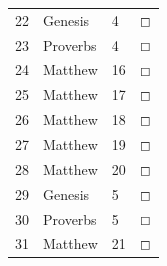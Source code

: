 \documentclass[11pt,landscape,twocolumn,letterpaper]{article}
\begin{document}
\begin{tabular}{p{0.5in}p{1.6in}p{1.3in}p{0.35in}}
  \textcolor[rgb]{0.00,0.00,1.00}{22} & \textcolor[rgb]{0.00,0.00,1.00}{\textcolor[rgb]{0.98,0.00,0.00}{Genesis}} & \textcolor[rgb]{0.98,0.00,0.00}{4} & \textcolor[rgb]{0.00,0.00,1.00}{$\boxempty$}\\

  \textcolor[rgb]{0.00,0.00,1.00}{23} & \textcolor[rgb]{0.00,0.00,1.00}{\textcolor[rgb]{0.98,0.00,0.00}{Proverbs}} & \textcolor[rgb]{0.98,0.00,0.00}{4} & \textcolor[rgb]{0.00,0.00,1.00}{$\boxempty$}\\

  \textcolor[rgb]{0.00,0.00,1.00}{24} & \textcolor[rgb]{0.00,0.00,1.00}{Matthew} & 16 & \textcolor[rgb]{0.00,0.00,1.00}{$\boxempty$}\\

  \textcolor[rgb]{0.00,0.00,1.00}{25} & \textcolor[rgb]{0.00,0.00,1.00}{Matthew} & 17 & \textcolor[rgb]{0.00,0.00,1.00}{$\boxempty$}\\

  \textcolor[rgb]{0.00,0.00,1.00}{26} & \textcolor[rgb]{0.00,0.00,1.00}{Matthew} & 18 & \textcolor[rgb]{0.00,0.00,1.00}{$\boxempty$}\\

  \textcolor[rgb]{0.00,0.00,1.00}{27} & \textcolor[rgb]{0.00,0.00,1.00}{Matthew} & 19 & \textcolor[rgb]{0.00,0.00,1.00}{$\boxempty$}\\

  \textcolor[rgb]{0.00,0.00,1.00}{28} & \textcolor[rgb]{0.00,0.00,1.00}{Matthew} & 20 & \textcolor[rgb]{0.00,0.00,1.00}{$\boxempty$}\\

  \textcolor[rgb]{0.00,0.00,1.00}{29} & \textcolor[rgb]{0.00,0.00,1.00}{\textcolor[rgb]{0.98,0.00,0.00}{Genesis}} & \textcolor[rgb]{0.98,0.00,0.00}{5} & \textcolor[rgb]{0.00,0.00,1.00}{$\boxempty$}\\

  \textcolor[rgb]{0.00,0.00,1.00}{30} & \textcolor[rgb]{0.00,0.00,1.00}{\textcolor[rgb]{0.98,0.00,0.00}{Proverbs}} & \textcolor[rgb]{0.98,0.00,0.00}{5} & \textcolor[rgb]{0.00,0.00,1.00}{$\boxempty$}\\

  \textcolor[rgb]{0.00,0.00,1.00}{31} & \textcolor[rgb]{0.00,0.00,1.00}{Matthew} & 21 & \textcolor[rgb]{0.00,0.00,1.00}{$\boxempty$}\\

\end{tabular}
\end{document}
